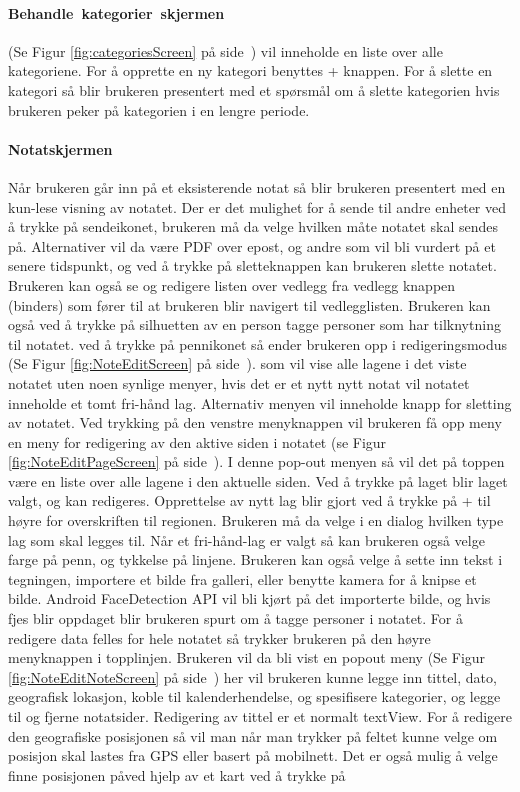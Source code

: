 \documentclass[a4paper, 12pt]{article}
\begin{document}
\paragraph{Behandle~kategorier~skjermen}(Se Figur \ref{fig:categoriesScreen} på side~\pageref{fig:categoriesScreen}) vil inneholde en liste over alle kategoriene. For å opprette en ny kategori benyttes + knappen. For å slette en kategori så blir brukeren presentert med et spørsmål om å slette kategorien hvis brukeren peker på kategorien i en lengre periode.

\paragraph{Notatskjermen} Når brukeren går inn på et eksisterende notat så blir brukeren presentert med en kun-lese visning av notatet. Der er det mulighet for å sende til andre enheter ved å trykke på sendeikonet, brukeren må da velge hvilken måte notatet skal sendes på. Alternativer vil da være PDF over epost, og andre som vil bli vurdert på et senere tidspunkt, og ved å trykke på sletteknappen kan brukeren slette notatet. Brukeren kan også se og redigere listen over vedlegg fra vedlegg knappen (binders) som fører til at brukeren blir navigert til vedlegglisten. Brukeren kan også ved å trykke på silhuetten av en person tagge personer som har tilknytning til notatet. ved å trykke på pennikonet så ender brukeren opp i redigeringsmodus (Se Figur \ref{fig:NoteEditScreen} på side~\pageref{fig:NoteEditScreen}). som vil vise alle lagene i det viste notatet uten noen synlige menyer, hvis det er et nytt nytt notat vil notatet inneholde et tomt fri-hånd lag. Alternativ menyen vil inneholde knapp for sletting av notatet. Ved trykking på den venstre menyknappen vil brukeren få opp meny en meny for redigering av den aktive siden i notatet (se Figur \ref{fig:NoteEditPageScreen} på side~\pageref{fig:NoteEditPageScreen}). I denne pop-out menyen så vil det på toppen være en liste over alle lagene i den aktuelle siden. Ved å trykke på laget blir laget valgt, og kan redigeres. Opprettelse av nytt lag blir gjort ved å trykke på + til høyre for overskriften til regionen. Brukeren må da velge i en dialog hvilken type lag som skal legges til. Når et fri-hånd-lag er valgt så kan brukeren også velge farge på penn, og tykkelse på linjene. Brukeren kan også velge å sette inn tekst i tegningen, importere et bilde fra galleri, eller benytte kamera for å knipse et bilde. Android FaceDetection API vil bli kjørt på det importerte bilde, og hvis fjes blir oppdaget blir brukeren spurt om å tagge personer i notatet. For å redigere data felles for hele notatet så trykker brukeren på den høyre menyknappen i topplinjen. Brukeren vil da bli vist en popout meny (Se Figur \ref{fig:NoteEditNoteScreen} på side~\pageref{fig:NoteEditNoteScreen}) her vil brukeren kunne legge inn tittel, dato, geografisk lokasjon, koble til kalenderhendelse, og spesifisere kategorier, og legge til og fjerne notatsider. Redigering av tittel er et normalt textView. For å redigere den geografiske posisjonen så vil man når man trykker på feltet kunne velge om posisjon skal lastes fra GPS eller basert på mobilnett. Det er også mulig å velge finne posisjonen påved hjelp av et kart ved å trykke på 
\end{document}
